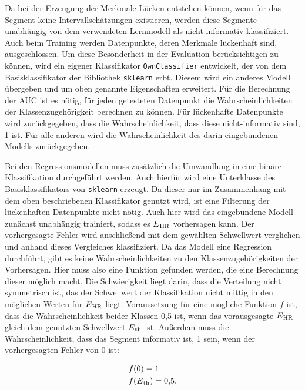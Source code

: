 Da bei der Erzeugung der Merkmale Lücken entstehen können, wenn für das Segment keine Intervallschätzungen existieren, werden diese Segmente unabhängig von dem verwendeten Lernmodell als nicht informativ klassifiziert. Auch beim Training werden Datenpunkte, deren Merkmale lückenhaft sind, ausgeschlossen. Um diese Besonderheit in der Evaluation berücksichtigen zu können, wird ein eigener Klassifikator \texttt{OwnClassifier} entwickelt, der von dem Basisklassifikator der Bibliothek \texttt{sklearn} erbt. Diesem wird ein anderes Modell übergeben und um oben genannte Eigenschaften erweitert. Für die Berechnung der \ac{AUC} ist es nötig, für jeden getesteten Datenpunkt die Wahrscheinlichkeiten der Klassenzugehörigkeit berechnen zu können. Für lückenhafte Datenpunkte wird zurückgegeben, dass die Wahrscheinlichkeit, dass diese nicht-informativ sind, 1 ist. Für alle anderen wird die Wahrscheinlichkeit des darin eingebundenen Modells zurückgegeben.%

Bei den Regressionsmodellen muss zusätzlich die Umwandlung in eine binäre Klassifikation durchgeführt werden.  Auch hierfür wird eine Unterklasse des Basisklassifikators von \texttt{sklearn} erzeugt. Da dieser nur im Zusammenhang mit dem oben beschriebenen Klassifikator genutzt wird, ist eine Filterung der lückenhaften Datenpunkte nicht nötig. Auch hier wird das eingebundene Modell zunächst unabhängig trainiert, sodass es $E\textsubscript{HR}$ vorhersagen kann. Der vorhergesagte Fehler wird anschließend mit dem gewählten Schwellwert verglichen und anhand dieses Vergleiches klassifiziert. Da das Modell eine Regression durchführt, gibt es keine Wahrscheinlichkeiten zu den Klassenzugehörigkeiten der Vorhersagen. Hier muss also eine Funktion gefunden werden, die eine Berechnung dieser möglich macht. Die Schwierigkeit liegt darin, dass die Verteilung nicht symmetrisch ist, das der Schwellwert der Klassifikation nicht mittig in den möglichen Werten für $E\textsubscript{HR}$ liegt. Voraussetzung für eine mögliche Funktion $f$ ist, dass die Wahrscheinlichkeit beider Klassen 0,5 ist, wenn das vorausgesagte $E\textsubscript{HR}$ gleich dem genutzten Schwellwert $E\textsubscript{th}$ ist. Außerdem muss die Wahrscheinlichkeit, dass das Segment informativ ist, 1 sein, wenn der vorhergesagten Fehler von 0 ist:

\begin{align*}
	&f(0) = 1\\
	&f(E\textsubscript{th}) = 0{,}5\text{.}
\end{align*}


